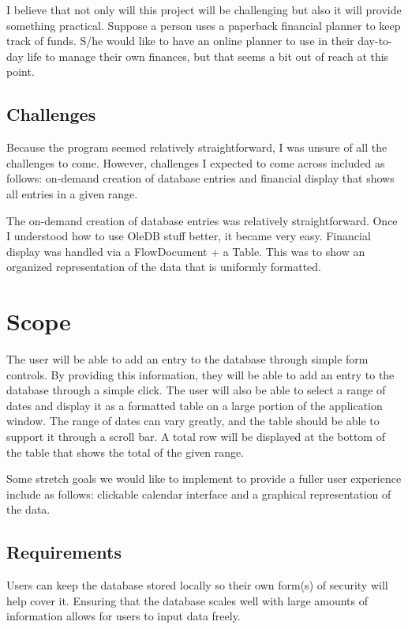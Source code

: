 \documentclass[10pt,conference,onecolumn,compsoc]{IEEEtran}
\begin{document}
I believe that not only will this project will be challenging but also it will provide something practical. Suppose a person uses a paperback financial planner to keep track of funds. S/he would like to have an online planner to use in their day-to-day life to manage their own finances, but that seems a bit out of reach at this point.


\subsection{Challenges}
Because the program seemed relatively straightforward, I was unsure of all the challenges to come. However, challenges I expected to come across included as follows: on-demand creation of database entries and financial display that shows all entries in a given range.

The on-demand creation of database entries was relatively straightforward. Once I understood how to use OleDB stuff better, it became very easy.
Financial display was handled via a FlowDocument + a Table. This was to show an organized representation of the data that is uniformly formatted.


\section{Scope}
The user will be able to add an entry to the database through simple form controls. By providing this information, they will be able to add an entry to the database through a simple click. The user will also be able to select a range of dates and display it as a formatted table on a large portion of the application window. The range of dates can vary greatly, and the table should be able to support it through a scroll bar. A total row will be displayed at the bottom of the table that shows the total of the given range.

Some stretch goals we would like to implement to provide a fuller user experience include as follows: clickable calendar interface and a graphical representation of the data.



\subsection{Requirements}
Users can keep the database stored locally so their own form(s) of security will help cover it. Ensuring that the database scales well with large amounts of information allows for users to input data freely.
\end{document}
